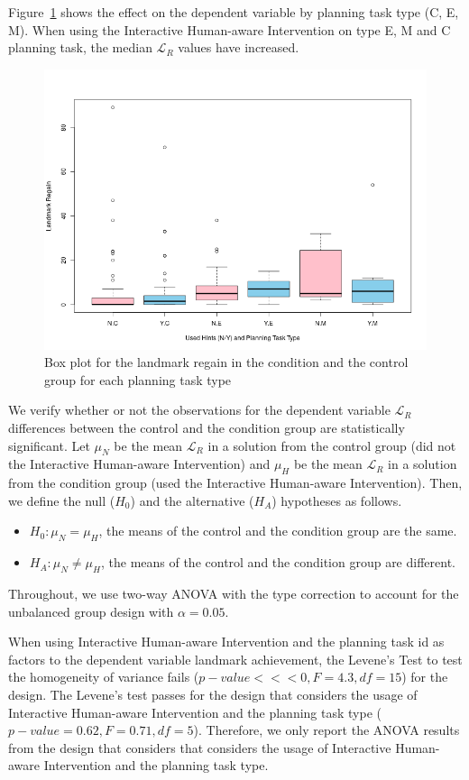 Figure~\ref{fig:regainbytype} shows the effect on the dependent variable by planning task type (C, E, M).
When using the Interactive Human-aware Intervention on type E, M and C planning task, the median $\mathcal{L}_R$ values have increased.
\begin{figure}[tpb]
  \centering
\includegraphics[width=0.9\columnwidth]{img/regainbytype.png}
  \caption{Box plot for the landmark regain in the condition and the control group for each planning task type}
  \label{fig:regainbytype}
\end{figure}

We verify whether or not the observations for the dependent variable $\mathcal{L}_R$ differences between the control and the condition group are statistically significant.
Let $\mu_N$ be the mean $\mathcal{L}_R$ in a solution from the control group (did not the Interactive Human-aware Intervention) and $\mu_H$ be the mean $\mathcal{L}_R$ in a solution from the condition group (used the Interactive Human-aware Intervention).
Then, we define the null ($H_0$) and the alternative ($H_A$) hypotheses as follows.
\begin{itemize}
\item $H_0: \mu_N = \mu_H$, the means of the control and the condition group are the same.
\item $H_A: \mu_N \neq \mu_H$, the means of the control and the condition group are different.
\end{itemize}
Throughout, we use two-way ANOVA with the type  correction to account for the unbalanced group design with $\alpha=0.05$.

When using Interactive Human-aware Intervention and the planning task id as factors to the dependent variable landmark achievement, the Levene's Test to test the homogeneity of variance fails ($p-value<<<0, F=4.3 ,df=15$) for the design.
The  Levene's test passes for the design that considers the usage of Interactive Human-aware Intervention and the planning task type ($p-value=0.62, F=0.71, df=5$).
Therefore, we only report the ANOVA results from the design that considers that considers the usage of Interactive Human-aware Intervention and the planning task type.

